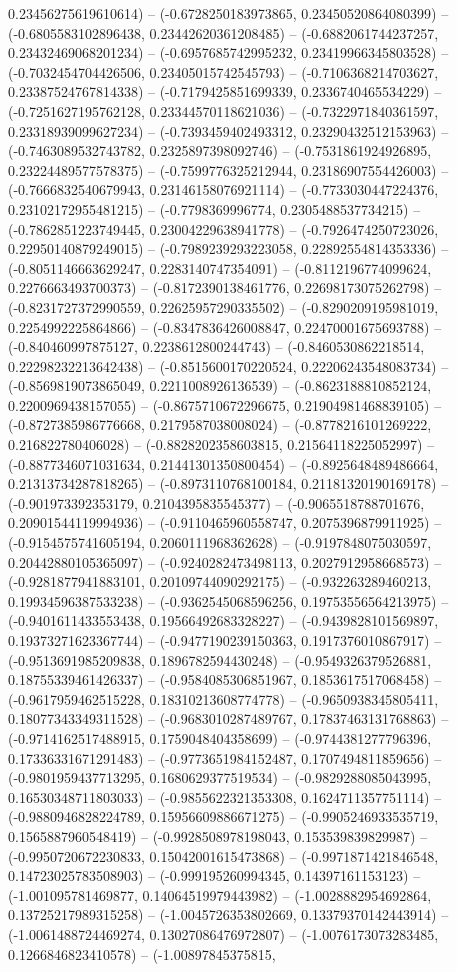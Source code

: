 0.23456275619610614) -- (-0.6728250183973865, 0.23450520864080399) -- (-0.6805583102896438, 0.23442620361208485) -- (-0.6882061744237257, 0.23432469068201234) -- (-0.6957685742995232, 0.23419966345803528) -- (-0.7032454704426506, 0.23405015742545793) -- (-0.7106368214703627, 0.23387524767814338) -- (-0.7179425851699339, 0.2336740465534229) -- (-0.7251627195762128, 0.23344570118621036) -- (-0.7322971840361597, 0.23318939099627234) -- (-0.7393459402493312, 0.23290432512153963) -- (-0.7463089532743782, 0.2325897398092746) -- (-0.7531861924926895, 0.23224489577578375) -- (-0.7599776325212944, 0.23186907554426003) -- (-0.7666832540679943, 0.23146158076921114) -- (-0.7733030447224376, 0.23102172955481215) -- (-0.7798369996774, 0.2305488537734215) -- (-0.7862851223749445, 0.23004229638941778) -- (-0.7926474250723026, 0.22950140879249015) -- (-0.7989239293223058, 0.22892554814353336) -- (-0.8051146663629247, 0.2283140747354091) -- (-0.8112196774099624, 0.2276663493700373) -- (-0.8172390138461776, 0.22698173075262798) -- (-0.8231727372990559, 0.22625957290335502) -- (-0.8290209195981019, 0.2254992225864866) -- (-0.8347836426008847, 0.22470001675693788) -- (-0.840460997875127, 0.2238612800244743) -- (-0.8460530862218514, 0.22298232213642438) -- (-0.8515600170220524, 0.22206243548083734) -- (-0.8569819073865049, 0.2211008926136539) -- (-0.8623188810852124, 0.2200969438157055) -- (-0.8675710672296675, 0.21904981468839105) -- (-0.8727385986776668, 0.2179587038008024) -- (-0.8778216101269222, 0.216822780406028) -- (-0.8828202358603815, 0.21564118225052997) -- (-0.8877346071031634, 0.21441301350800454) -- (-0.8925648489486664, 0.21313734287818265) -- (-0.8973110768100184, 0.21181320190169178) -- (-0.901973392353179, 0.2104395835545377) -- (-0.9065518788701676, 0.20901544119994936) -- (-0.9110465960558747, 0.2075396879911925) -- (-0.9154575741605194, 0.2060111968362628) -- (-0.9197848075030597, 0.20442880105365097) -- (-0.9240282473498113, 0.2027912958668573) -- (-0.9281877941883101, 0.20109744090292175) -- (-0.932263289460213, 0.19934596387533238) -- (-0.9362545068596256, 0.19753556564213975) -- (-0.9401611433553438, 0.19566492683328227) -- (-0.9439828101569897, 0.19373271623367744) -- (-0.9477190239150363, 0.1917376010867917) -- (-0.9513691985209838, 0.1896782594430248) -- (-0.9549326379526881, 0.18755339461426337) -- (-0.9584085306851967, 0.1853617517068458) -- (-0.9617959462515228, 0.18310213608774778) -- (-0.9650938345805411, 0.18077343349311528) -- (-0.9683010287489767, 0.17837463131768863) -- (-0.9714162517488915, 0.1759048404358699) -- (-0.9744381277796396, 0.17336331671291483) -- (-0.9773651984152487, 0.1707494811859656) -- (-0.9801959437713295, 0.1680629377519534) -- (-0.9829288085043995, 0.16530348711803033) -- (-0.9855622321353308, 0.1624711357751114) -- (-0.9880946828224789, 0.15956609886671275) -- (-0.9905246933535719, 0.1565887960548419) -- (-0.9928508978198043, 0.153539839829987) -- (-0.9950720672230833, 0.15042001615473868) -- (-0.9971871421846548, 0.14723025783508903) -- (-0.999195260994345, 0.14397161153123) -- (-1.001095781469877, 0.14064519979443982) -- (-1.0028882954692864, 0.13725217989315258) -- (-1.0045726353802669, 0.13379370142443914) -- (-1.0061488724469274, 0.13027086476972807) -- (-1.0076173073283485, 0.1266846823410578) -- (-1.00897845375815, 